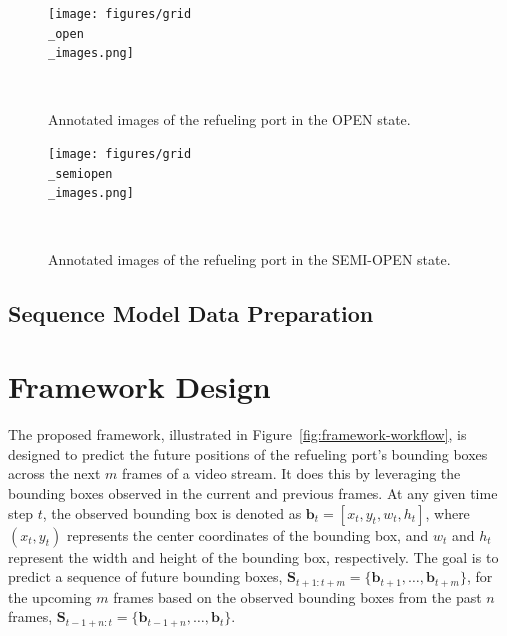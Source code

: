 \documentclass[12pt,oneside]{book} %
\begin{document}
\begin{figure}[H]
    \centering
    \texttt{[image: figures/grid\\\_open\\\_images.png]}
    \caption{Annotated images of the refueling port in the OPEN state.}~\label{fig:grid-open-images}
\end{figure}

\begin{figure}[H]
    \centering
    \texttt{[image: figures/grid\\\_semiopen\\\_images.png]}
    \caption{Annotated images of the refueling port in the SEMI-OPEN state.}~\label{fig:grid-semi-open-images}
\end{figure}

\subsection{Sequence Model Data Preparation}

\section{Framework Design}
The proposed framework, illustrated in Figure~\ref{fig:framework-workflow}, is
designed to predict the future positions of the refueling port’s bounding boxes
across the next \(m\) frames of a video stream. It does this by leveraging the
bounding boxes observed in the current and previous frames. At any given time
step \(t\), the observed bounding box is denoted as \(\mathbf{b}_t = [x_t, y_t,
w_t, h_t]\), where \((x_t, y_t)\) represents the center coordinates of the
bounding box, and \(w_t\) and \(h_t\) represent the width and height of the
bounding box, respectively. The goal is to predict a sequence of future
bounding boxes, \(\mathbf{S}_{t+1:t+m} = \{\mathbf{b}_{t+1}, \dots,
\mathbf{b}_{t+m}\}\), for the upcoming \(m\) frames based on the observed
bounding boxes from the past \(n\) frames, \(\mathbf{S}_{t-1+n:t} =
\{\mathbf{b}_{t-1+n}, \dots, \mathbf{b}_{t}\}\). 
\end{document}
